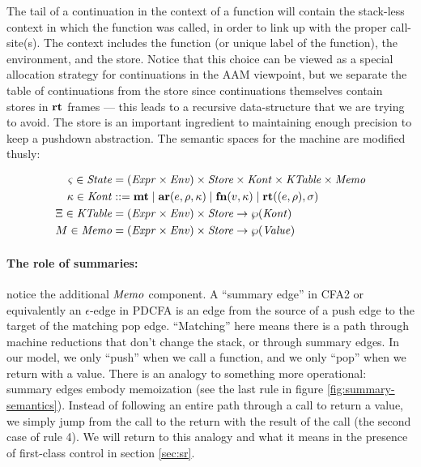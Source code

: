 \documentclass{llncs}
\begin{document}
The tail of a continuation in the context of a function will contain
the stack-less context in which the function was called, in order to
link up with the proper call-site(s). The context includes the
function (or unique label of the function), the environment, and the
store. Notice that this choice can be viewed as a special allocation
strategy for continuations in the AAM viewpoint, but we separate the
table of continuations from the store since continuations themselves
contain stores in $\mathbf{rt}$ frames --- this leads to a recursive
data-structure that we are trying to avoid. The store is an important
ingredient to maintaining enough precision to keep a pushdown
abstraction. The semantic spaces for the machine are modified thusly:

\begin{align*}
  \varsigma \in \mathit{State} &= (\mathit{Expr} \times \mathit{Env}) \times \mathit{Store} \times \mathit{Kont} \times \mathit{KTable} \times \mathit{Memo} \\
  \kappa \in \mathit{Kont} &::= \mathbf{mt}
                     \mid \mathbf{ar}{}(e,\rho,\kappa) 
                     \mid \mathbf{fn}{}(v,\kappa)
                     \mid \mathbf{rt}((e,\rho),\sigma)\\
  \Xi \in \mathit{KTable} &= (\mathit{Expr} \times \mathit{Env})\times \mathit{Store} \to \wp(\mathit{Kont}) \\
  M \in \mathit{Memo} &= (\mathit{Expr} \times \mathit{Env})\times \mathit{Store} \to \wp(\mathit{Value})
\end{align*}

\paragraph{The role of summaries:} notice the additional $\mathit{Memo}$
component. A ``summary edge'' in CFA2 or equivalently an
$\epsilon$-edge in PDCFA is an edge from the source of a push edge to
the target of the matching pop edge. ``Matching'' here means there is
a path through machine reductions that don't change the stack, or
through summary edges. In our model, we only ``push'' when we call a
function, and we only ``pop'' when we return with a value. There is an
analogy to something more operational: summary edges embody
memoization (see the last rule in figure
\ref{fig:summary-semantics}). Instead of following an entire path
through a call to return a value, we simply jump from the call to the
return with the result of the call (the second case of rule 4). We
will return to this analogy and what it means in the presence of
first-class control in section \ref{sec:sr}.
\end{document}
